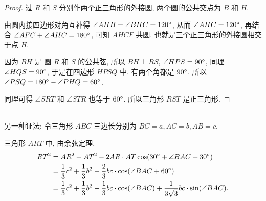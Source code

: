 \begin{figure*}[htbp]
\begin{minipage}[t]{0.49\linewidth}
\end{minipage}
\end{figure*}

\begin{proof}
过 $ R $ 和 $ S $ 分别作两个正三角形的外接圆, 两个圆的公共交点为 $ B $ 和 $ H $. 

由圆内接四边形对角互补得 $ \angle AHB = \angle BHC = 120 \degree $, 从而 $ \angle AHC = 120\degree $, 再结合 $ \angle AFC + \angle AHC = 180 \degree $, 可知 $ AHCF $ 共圆. 也就是三个正三角形的外接圆相交于点 $ H $.

因为 $ BH $ 是 圆 $ R $ 和 $ S $ 的公共弦, 所以 $ BH \perp RS $, $ \angle HPS = 90\degree $, 同理 $ \angle HQS = 90\degree $, 于是在四边形 $ HPSQ $ 中, 有两个角都是 $ 90\degree $, 所以 $ \angle PSQ = 180\degree-\angle PHQ= 60\degree $.

同理可得 $ \angle SRT $ 和 $ \angle STR $ 也等于 $ 60\degree $. 所以三角形 $ RST $ 是正三角形.
\end{proof}
~\\
\noindent 另一种证法: 令三角形 $ ABC $ 三边长分别为 $ BC = a, AC = b, AB = c $.

三角形 $ ART $ 中, 由余弦定理, 
\begin{align*} 
RT^2 &= AR^2 + AT^2 - 2AR\cdot AT\cos(30\degree+\angle BAC+30\degree)\\
	&= \frac{1}{3}c^2 + \frac{1}{3}b^2 - \frac{2}{3}bc\cdot\cos(\angle BAC + 60\degree)\\
	&= \frac{1}{3}c^2 + \frac{1}{3}b^2 - \frac{1}{3}bc\cdot\cos(\angle BAC) + \frac{1}{3\sqrt{3}}bc\cdot\sin(\angle BAC).
\end{align*}

